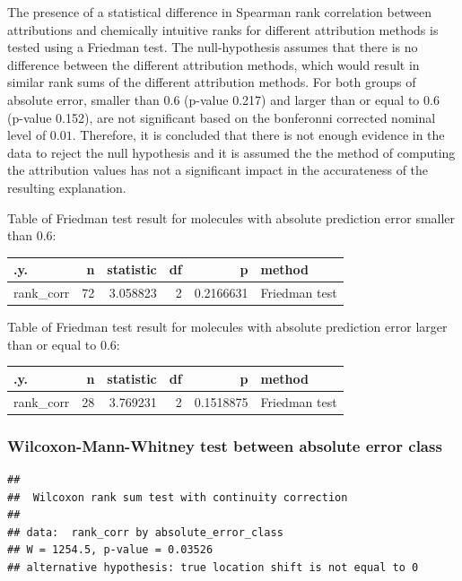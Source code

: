 \documentclass[
  12pt,
  a4paper]{article}
\begin{document}
The presence of a statistical difference in Spearman rank correlation
between attributions and chemically intuitive ranks for different
attribution methods is tested using a Friedman test. The null-hypothesis
assumes that there is no difference between the different attribution
methods, which would result in similar rank sums of the different
attribution methods. For both groups of absolute error, smaller than
\(0.6\) (p-value 0.217) and larger than or equal to \(0.6\) (p-value
0.152), are not significant based on the bonferonni corrected nominal
level of \(0.01\). Therefore, it is concluded that there is not enough
evidence in the data to reject the null hypothesis and it is assumed the
the method of computing the attribution values has not a significant
impact in the accurateness of the resulting explanation.

Table of Friedman test result for molecules with absolute prediction
error smaller than \(0.6\):

\begin{longtable}[]{@{}lrrrrl@{}}
\toprule\noalign{}
.y. & n & statistic & df & p & method \\
\midrule\noalign{}
\endhead
\bottomrule\noalign{}
\endlastfoot
rank\_corr & 72 & 3.058823 & 2 & 0.2166631 & Friedman test \\
\end{longtable}

Table of Friedman test result for molecules with absolute prediction
error larger than or equal to \(0.6\):

\begin{longtable}[]{@{}lrrrrl@{}}
\toprule\noalign{}
.y. & n & statistic & df & p & method \\
\midrule\noalign{}
\endhead
\bottomrule\noalign{}
\endlastfoot
rank\_corr & 28 & 3.769231 & 2 & 0.1518875 & Friedman test \\
\end{longtable}

\hypertarget{wilcoxon-mann-whitney-test-between-absolute-error-class}{%
\subsubsection{Wilcoxon-Mann-Whitney test between absolute error
class}\label{wilcoxon-mann-whitney-test-between-absolute-error-class}}

\begin{verbatim}
## 
##  Wilcoxon rank sum test with continuity correction
## 
## data:  rank_corr by absolute_error_class
## W = 1254.5, p-value = 0.03526
## alternative hypothesis: true location shift is not equal to 0
\end{verbatim}
\end{document}
